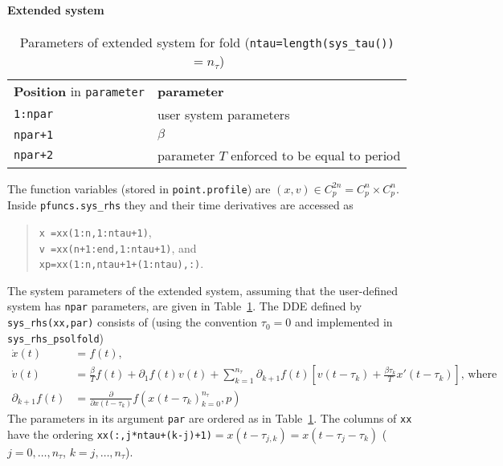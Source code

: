 \documentclass[11pt]{scrartcl}
\newcommand{\blist}[1]{\mbox{\lstinline!#1!}}
\begin{document}
\paragraph{Extended system}
\begin{table}[ht]
  \centering
  \begin{tabular}[t]{l@{\qquad}l}\hline\noalign{\medskip}
    \textbf{Position} in \blist{parameter} & \textbf{parameter}
    \\\noalign{\medskip}
    \blist{1:npar} & user system parameters\\
    \blist{npar+1} & $\beta$\\
    \blist{npar+2} & parameter $T$ enforced to be equal to period\\[0.5ex]\hline%
  \end{tabular}
  \caption{Parameters of extended system for fold 
    (\blist{ntau=length(sys_tau())}$=n_\tau$)}
  \label{tab:foldpars}
\end{table}
The function variables (stored in \blist{point.profile}) are
$(x,v)\in C_p^{2n}=C_p^n\times C_p^n$. Inside \blist{pfuncs.sys_rhs}
they and their time derivatives are accessed as
\begin{quote}
  \blist{x =xx(1:n,1:ntau+1)},\\ \blist{v =xx(n+1:end,1:ntau+1)}, and\\
  \blist{xp=xx(1:n,ntau+1+(1:ntau),:)}.
\end{quote}
The system parameters of the extended system, assuming that the
user-defined system has \blist{npar} parameters, are given in
Table~\ref{tab:foldpars}.  The DDE defined by \blist{sys_rhs(xx,par)}
consists of (using the convention $\tau_{0}=0$ and implemented in
\blist{sys_rhs_psolfold})
\begin{align}
    \label{eq:po:impdde}
  \dot x(t)&= f(t)\mbox{,}\\
    \label{eq:fold:impdde}
    \dot v(t)&=\frac{\beta}{T}f(t)+\partial_1f(t)v(t)+\sum_{k=1}^{n_\tau}
    \partial_{k+1}f(t)\left[v(t-\tau_k)+\frac{\beta\tau_k}{T}x'(t-\tau_k)\right]\mbox{, where}\\
    \nonumber
    \partial_{k+1}f(t)&=\frac{\partial}{\partial x(t-\tau_k)}f\left(x(t-\tau_k)_{k=0}^{n_\tau},p\right)
\end{align}
The parameters in its argument \blist{par} are ordered as in
Table~\ref{tab:foldpars}. The columns of \blist{xx} have the ordering
\blist{xx(:,j*ntau+(k-j)+1)}$=x(t-\tau_{j,k})=x(t-\tau_j-\tau_k)$
($j=0,\ldots,n_\tau$, $k=j,\ldots,n_\tau$).
\end{document}
